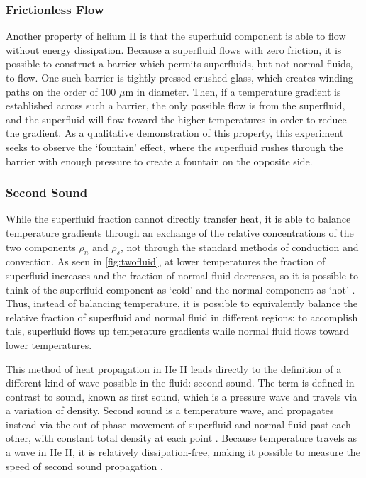 \subsubsection{Frictionless Flow}\label{frictionlessflow}
Another property of helium II is that the superfluid component is able
to flow without energy dissipation. Because a superfluid flows with
zero friction, it is possible to construct a barrier which permits
superfluids, but not normal fluids, to flow. One such barrier is
tightly pressed crushed glass, which creates winding paths on the
order of $100$ $\mu$m in diameter. Then, if a temperature gradient is
established across such a barrier, the only possible flow is from the
superfluid, and the superfluid will flow toward the higher
temperatures in order to reduce the gradient. As a qualitative
demonstration of this property, this experiment seeks to observe the
`fountain' effect, where the superfluid rushes through the barrier
with enough pressure to create a fountain on the opposite side.

\subsubsection{Second Sound}\label{secondsound}
While the superfluid fraction cannot directly transfer heat, it
is able to balance temperature gradients through an exchange of the
relative concentrations of the two components $\rho_n$ and
$\rho_s$, not through the standard methods of conduction and convection. As seen in \ref{fig:twofluid}, at lower temperatures the
fraction of superfluid increases and the fraction of normal fluid
decreases, so it is possible to think of the superfluid component as
`cold' and the normal component as `hot' \cite{atkins}. Thus, instead
of balancing temperature, it is possible to equivalently balance the
relative fraction of superfluid and normal fluid in different regions:
to accomplish this, superfluid flows up temperature gradients while
normal fluid flows toward lower temperatures.

This method of heat propagation in He II leads directly to the
definition of a different kind of wave possible in the fluid: second
sound. The term is defined in contrast to sound, known as first sound,
which is a pressure wave and travels via a variation of
density. Second sound is a temperature wave, and propagates instead
via the out-of-phase movement of superfluid and normal fluid past each
other, with constant total density at each point
\cite{atkins}. Because temperature travels as a wave in He II, it is
relatively dissipation-free, making it possible to measure the speed
of second sound propagation \cite{atkins}.

